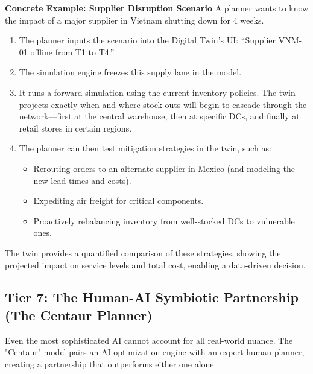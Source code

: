 \documentclass{article}
\begin{document}
\textbf{Concrete Example: Supplier Disruption Scenario}
A planner wants to know the impact of a major supplier in Vietnam shutting down for 4 weeks.
\begin{enumerate}
    \item The planner inputs the scenario into the Digital Twin's UI: ``Supplier VNM-01 offline from T1 to T4.''
    \item The simulation engine freezes this supply lane in the model.
    \item It runs a forward simulation using the current inventory policies. The twin projects exactly when and where stock-outs will begin to cascade through the network---first at the central warehouse, then at specific DCs, and finally at retail stores in certain regions.
    \item The planner can then test mitigation strategies in the twin, such as:
    \begin{itemize}
        \item Rerouting orders to an alternate supplier in Mexico (and modeling the new lead times and costs).
        \item Expediting air freight for critical components.
        \item Proactively rebalancing inventory from well-stocked DCs to vulnerable ones.
    \end{itemize}
\end{enumerate}
The twin provides a quantified comparison of these strategies, showing the projected impact on service levels and total cost, enabling a data-driven decision.

\subsection{Tier 7: The Human-AI Symbiotic Partnership (The Centaur Planner)}

Even the most sophisticated AI cannot account for all real-world nuance. The "Centaur" model pairs an AI optimization engine with an expert human planner, creating a partnership that outperforms either one alone.
\end{document}
